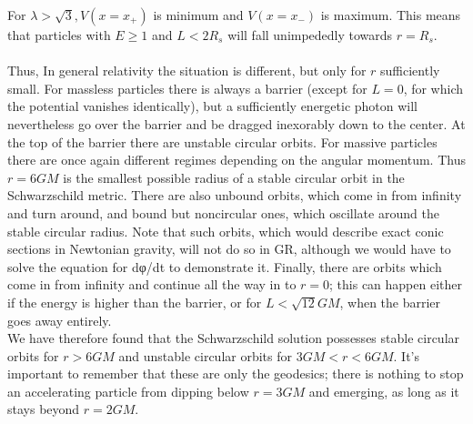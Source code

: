 	For $\lambda > \sqrt{3}, V(x=x_+)$ is minimum and $V(x=x_-)$ is maximum. This means that particles with $E\geq 1$ and $L < 2R_s$ will fall unimpededly towards $r=R_s$.\\
	\\
	Thus, In general relativity the situation is different, but only for $r$ sufficiently small. For massless particles there is always a barrier (except
	for $L = 0$, for which the potential vanishes identically), but a sufficiently energetic photon
	will nevertheless go over the barrier and be dragged inexorably down to the center. At the top
	of the barrier there are unstable circular orbits. For massive particles there are once again different regimes depending on the angular
	momentum. Thus $r=6GM$ is the smallest possible radius of a stable
	circular orbit in the Schwarzschild metric. There are also unbound orbits, which come in
	from infinity and turn around, and bound but noncircular ones, which oscillate around the
	stable circular radius. Note that such orbits, which would describe exact conic sections in
	Newtonian gravity, will not do so in GR, although we would have to solve the equation for
	dφ/dt to demonstrate it. Finally, there are orbits which come in from infinity and continue
	all the way in to $r = 0$; this can happen either if the energy is higher than the barrier, or for
	$L < \sqrt{12}GM$, when the barrier goes away entirely.\\
	We have therefore found that the Schwarzschild solution possesses stable circular orbits
	for $r > 6GM$ and unstable circular orbits for $3GM < r < 6GM$. It’s important to remember
	that these are only the geodesics; there is nothing to stop an accelerating particle from
	dipping below $r = 3GM$ and emerging, as long as it stays beyond $r = 2GM$.
